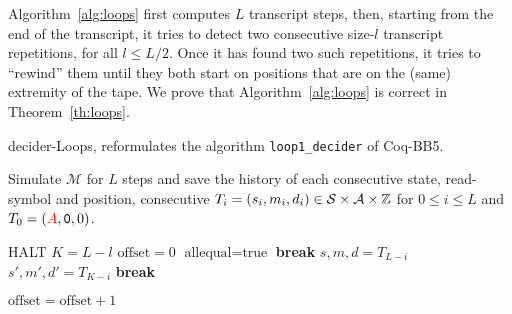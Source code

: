 Algorithm~\ref{alg:loops} first computes $L$ transcript steps, then, starting from the end of the transcript, it tries to detect two consecutive size-$l$ transcript repetitions, for all $l \leq L/2$. Once it has found two such repetitions, it tries to ``rewind'' them until they both start on positions that are on the (same) extremity of the tape. We prove that Algorithm~\ref{alg:loops} is correct in Theorem~\ref{th:loops}.




\begin{algorithm}
    \caption{{\sc decider-Loops}, reformulates the algorithm \texttt{loop1\_decider} of Coq-BB5.}\label{alg:loops}

    \begin{algorithmic}[1]

        \State
        \State Simulate $\mathcal{M}$ for $L$ steps and save the history of each consecutive state, read-symbol and position, \ie consecutive $T_i = (s_i,m_i,d_i)\in\mathcal{S}\times\mathcal{A}\times\mathbb{Z}$ for $0 \leq i \leq L$ and $T_0 = (\stateA,\symbolzero,0)$.


        \State {}
        \State \Return HALT \label{alg:loops:halt}
        \EndIf
        \State {} 
        \State $K = L-l$
        \State $\text{offset} = 0$ 
        \State $\text{allequal} = \text{true}$
        \State \For{$i$ \textbf{in} $[0,l+\text{offset}[$ }
        \State \textbf{break}
        \State \EndIf
        \State $s,m,d = T_{L-i}$
        \State $s',m',d' = T_{K-i}$
        \State
        \label{alg:loops:testeq} 
        \State \textbf{break}
        \EndIf

        \State {}
        \label{alg:loops:cycler}
        \State \Return \NONHALT {}
        \EndIf
        \State {}\label{alg:loops:tcplus}
        \State \Return \NONHALT {}
        \EndIf
        \State {}\label{alg:loops:tcminus}
        \State \Return \NONHALT {}
        \State \EndIf
        \State $\text{offset} = \text{offset} + 1$
        \State \EndIf
        \EndFor
        \EndFor

        \State \Return \UNKNOWN

    \end{algorithmic}

\end{algorithm}


